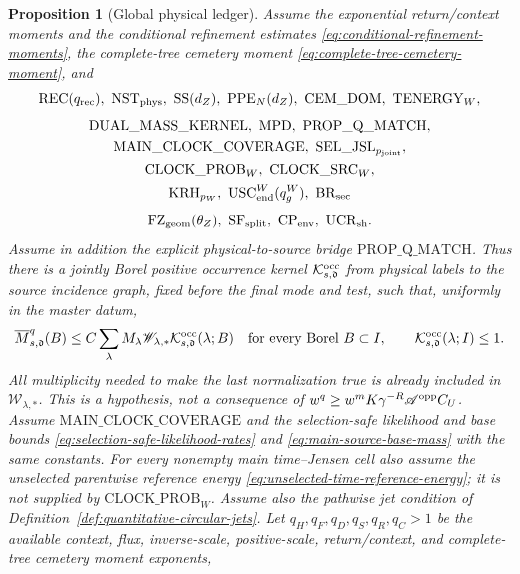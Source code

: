 \documentclass[11pt]{article}
\newtheorem{proposition}[theorem]{Proposition}
\begin{document}
\begin{proposition}[Global physical ledger]
\label{prop:global-labelled-ledger}
Assume the exponential return/context moments and the conditional refinement
estimates \eqref{eq:conditional-refinement-moments},
the complete-tree cemetery moment
\eqref{eq:complete-tree-cemetery-moment}, and
\[
 \mathrm{REC}(q_{\rm rec}),\ \mathrm{NST}_{\rm phys},\ \mathrm{SS}(d_Z),\
 \mathrm{PPE}_{N}(d_Z),\ \mathrm{CEM\_DOM},\ \mathrm{TENERGY}_{W},
\]
\[
 \begin{gathered}
 \mathrm{DUAL\_MASS\_KERNEL},\ \mathrm{MPD},\
 \mathrm{PROP\_Q\_MATCH},\\
 \mathrm{MAIN\_CLOCK\_COVERAGE},\
 \mathrm{SEL\_JSL}_{p_{\rm joint}},\\
 \mathrm{CLOCK\_PROB}_{W},\ \mathrm{CLOCK\_SRC}_{W},\\
 \mathrm{KRH}_{p_W},\ \mathrm{USC}_{\rm end}^{W}(q_g^W),\
 \mathrm{BR}_{\rm sec}
 \end{gathered}
\]
\[
 \mathrm{FZ}_{\rm geom}(\theta_Z),\ \mathrm{SF}_{\rm split},\
 \mathrm{CP}_{\rm env},\ \mathrm{UCR}_{\rm sh}.
\]
Assume in addition the explicit physical-to-source bridge
$\mathrm{PROP\_Q\_MATCH}$.  Thus there is a jointly Borel positive
occurrence kernel $\mathcal K_{s,\mathfrak d}^{\rm occ}$ from physical
labels to the source incidence graph, fixed before the final mode and test,
such that, uniformly in the master datum,
\begin{equation}
\label{eq:propagated-q-physical-match}
 \overline M_{s,\mathfrak d}^{q}(B)
 \le C\sum_\lambda M_\lambda\mathscr W_{\lambda,*}
       \mathcal K_{s,\mathfrak d}^{\rm occ}(\lambda;B)
 \quad\text{for every Borel }B\subset I,
 \qquad
 \mathcal K_{s,\mathfrak d}^{\rm occ}(\lambda;I)\le1.
\end{equation}
All multiplicity needed to make the last normalization true is already
included in $\mathscr W_{\lambda,*}$.  This is a hypothesis, not a
consequence of $w^q\ge w^mK\gamma^{-R}\mathscr A^{\rm opp}C_U$.
Assume $\mathrm{MAIN\_CLOCK\_COVERAGE}$ and the selection-safe likelihood
and base bounds \eqref{eq:selection-safe-likelihood-rates} and
\eqref{eq:main-source-base-mass} with the same constants.  For every
nonempty main time--Jensen cell also assume the unselected parentwise
reference energy \eqref{eq:unselected-time-reference-energy}; it is not
supplied by $\mathrm{CLOCK\_PROB}_{W}$.
Assume also the pathwise jet condition of
Definition~\ref{def:quantitative-circular-jets}.  Let
$q_H,q_F,q_D,q_S,q_R,q_C>1$ be the available context, flux, inverse-scale,
positive-scale, return/context, and complete-tree cemetery moment exponents,

\end{proposition}
\end{document}
